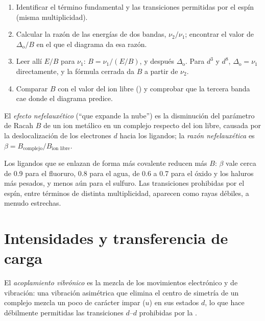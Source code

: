 \begin{method}\label{met:b3:complex-spectra-magnetism:read-ts}
\begin{enumerate}
  \item Identificar el término fundamental y las transiciones permitidas por el espín (misma
        multiplicidad).
  \item Calcular la razón de las energías de dos bandas, $\nu_2/\nu_1$; encontrar el valor de $\Delta_{\mathrm o}/B$ en
        el que el diagrama da esa razón.
  \item Leer allí $E/B$ para $\nu_1$: $B = \nu_1/(E/B)$, y después $\Delta_{\mathrm o}$. Para $d^3$ y $d^8$, $\Delta_{\mathrm o} = \nu_1$
        directamente, y la fórmula cerrada da $B$ a partir de $\nu_2$.
  \item Comparar $B$ con el valor del ion libre () y comprobar que la
        tercera banda cae donde el diagrama predice.
\end{enumerate}
\end{method}

\begin{definition}\label{def:b3:complex-spectra-magnetism:nephelauxetic}
El \emph{efecto nefelauxético} (``que expande la nube'') es
la disminución del parámetro de Racah $B$ de un ion metálico en un complejo respecto del
ion libre, causada por la deslocalización de los electrones $d$ hacia los
ligandos; la \emph{razón nefelauxética} es $\beta =
B_{\text{complejo}}/B_{\text{ion libre}}$.
\end{definition}

Los ligandos que se enlazan de forma más covalente reducen más $B$: $\beta$ vale cerca de 0.9 para el fluoruro, 0.8
para el agua, de 0.6 a 0.7 para el óxido y los haluros más pesados, y menos aún para el sulfuro.
Las transiciones prohibidas por el espín, entre términos de distinta multiplicidad, aparecen
como rayas débiles, a menudo estrechas.

\section{Intensidades y transferencia de carga}

\begin{definition}\label{def:b3:complex-spectra-magnetism:vibronic-coupling}
El \emph{acoplamiento vibrónico} es la mezcla de los movimientos
electrónico y de vibración: una vibración asimétrica que elimina el centro de
simetría de un complejo mezcla un poco de carácter impar ($u$) en sus estados $d$,
lo que hace débilmente permitidas las transiciones $d$--$d$ prohibidas por la .
\end{definition}


